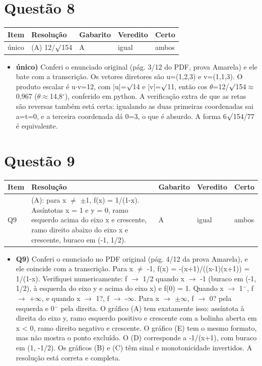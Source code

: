 \documentclass{article}%
\begin{document}
\section*{Questão 8}%
\begin{longtable}{@{}p{} p{} p{} p{} p{}@{}}\toprule Item & Resolução & Gabarito & Veredito & Certo \\ \midrule
único & (A) 12/$\surd$154 & A & igual & ambos \\
\bottomrule\end{longtable}%
\begin{itemize}%
\item%
\textbf{único)} Conferi o enunciado original (pág. 3/12 do PDF, prova Amarela) e ele bate com a transcrição. Os vetores diretores são u=(1,2,3) e v=(1,1,3). O produto escalar é u$\cdot$v=12, com |u|=$\surd$14 e |v|=$\surd$11, então cos $\theta$=12/$\surd$154$\approx$0,967 ($\theta$$\approx$14,8$^\circ$), conferido em python. A verificação extra de que as retas são reversas também está certa: igualando as duas primeiras coordenadas sai a=t=0, e a terceira coordenada dá 0=3, o que é absurdo. A forma 6$\surd$154/77 é equivalente.%
\end{itemize}%
\section*{Questão 9}%
\begin{longtable}{@{}p{} p{} p{} p{} p{}@{}}\toprule Item & Resolução & Gabarito & Veredito & Certo \\ \midrule
Q9 & (A): para x $\neq$ $\pm$1, f(x) = 1/(1-x). Assíntotas x = 1 e y = 0, ramo esquerdo acima do eixo x e crescente, ramo direito abaixo do eixo x e crescente, buraco em (-1, 1/2). & A & igual & ambos \\
\bottomrule\end{longtable}%
\begin{itemize}%
\item%
\textbf{Q9)} Conferi o enunciado no PDF original (pág. 4/12 da prova Amarela), e ele coincide com a transcrição. Para x $\neq$ -1, f(x) = -(x+1)/((x-1)(x+1)) = 1/(1-x). Verifiquei numericamente: f $\to$ 1/2 quando x $\to$ -1 (buraco em (-1, 1/2), à esquerda do eixo y e acima do eixo x) e f(0) = 1. Quando x $\to$ 1$^{-}$, f $\to$ +$\infty$, e quando x $\to$ 1?, f $\to$ -$\infty$. Para x $\to$ $\pm$$\infty$, f $\to$ 0? pela esquerda e 0$^{-}$ pela direita. O gráfico (A) tem exatamente isso: assíntota à direita do eixo y, ramo esquerdo positivo e crescente com a bolinha aberta em x < 0, ramo direito negativo e crescente. O gráfico (E) tem o mesmo formato, mas não mostra o ponto excluído. O (D) corresponde a -1/(x+1), com buraco em (1, -1/2). Os gráficos (B) e (C) têm sinal e monotonicidade invertidos. A resolução está correta e completa.%
\end{itemize}%
\end{document}
